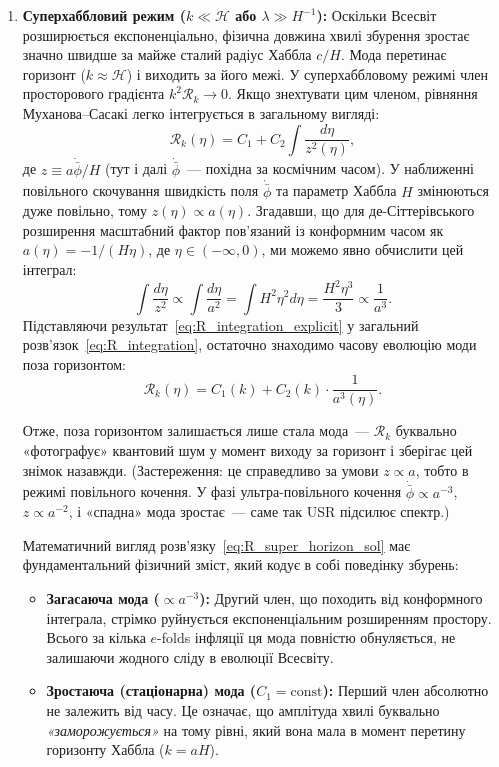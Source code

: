 \begin{enumerate}
\item \textbf{Суперхаббловий режим ($k \ll \mathcal{H}$ або $\lambda \gg H^{-1}$):}
  Оскільки Всесвіт розширюється експоненціально, фізична довжина хвилі збурення зростає значно швидше за майже сталий радіус Хаббла $c/H$. Мода перетинає горизонт ($k \approx \mathcal{H}$) і виходить за його межі. У суперхаббловому режимі член просторового градієнта $k^2\mathcal{R}_k \to 0$. Якщо знехтувати цим членом, рівняння Муханова--Сасакі легко інтегрується в загальному вигляді:
  \begin{equation}\label{eq:R_integration}
    \mathcal{R}_k(\eta) = C_1 + C_2 \int \frac{d\eta}{z^2(\eta)},
  \end{equation}
  де $z \equiv a \dot{\bar{\phi}} / H$ (тут і далі $\dot{\bar\phi}$~--- похідна за космічним часом). У наближенні повільного скочування швидкість поля $\dot{\bar{\phi}}$ та параметр Хаббла $H$ змінюються дуже повільно, тому $z(\eta) \propto a(\eta)$. Згадавши, що для де-Сіттерівського розширення масштабний фактор пов'язаний із конформним часом як $a(\eta) = -1/(H\eta)$, де $\eta \in (-\infty, 0)$, ми можемо явно обчислити цей інтеграл:
  \begin{equation}\label{eq:R_integration_explicit}
    \int \frac{d\eta}{z^2} \propto \int \frac{d\eta}{a^2} = \int H^2 \eta^2 d\eta = \frac{H^2 \eta^3}{3} \propto \frac{1}{a^3}.
  \end{equation}
  Підставляючи результат~\eqref{eq:R_integration_explicit} у загальний розв'язок~\eqref{eq:R_integration}, остаточно знаходимо часову еволюцію моди поза горизонтом:
  \begin{equation}\label{eq:R_super_horizon_sol}
    \mathcal{R}_k(\eta) = C_1 (k) + C_2 (k) \cdot \frac{1}{a^3(\eta)}.
  \end{equation}

    Отже, поза горизонтом залишається лише стала мода~---
    $\mathcal{R}_k$ буквально «фотографує» квантовий шум
    у момент виходу за горизонт і зберігає цей знімок назавжди.
    (Застереження: це справедливо за умови $z \propto a$, тобто в режимі
    повільного кочення. У фазі ультра-повільного кочення $\dot{\bar\phi} \propto a^{-3}$,
    $z \propto a^{-2}$, і «спадна» мода зростає~--- саме так USR підсилює спектр.)

  Математичний вигляд розв'язку~\eqref{eq:R_super_horizon_sol} має фундаментальний фізичний зміст, який кодує в собі поведінку збурень:
  \begin{itemize}
    \item \textbf{Загасаюча мода ($\propto a^{-3}$):} Другий член, що походить від конформного інтеграла, стрімко руйнується експоненціальним розширенням простору. Всього за кілька $e$-folds інфляції ця мода повністю обнуляється, не залишаючи жодного сліду в еволюції Всесвіту.
    \item \textbf{Зростаюча (стаціонарна) мода ($C_1 = \mathrm{const}$):} Перший член абсолютно не залежить від часу. Це означає, що амплітуда хвилі буквально \emph{«заморожується»} на тому рівні, який вона мала в момент перетину горизонту Хаббла ($k = aH$).
  \end{itemize}


\end{enumerate}
